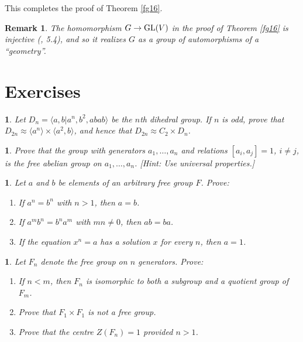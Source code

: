 \documentclass[a4paper,11pt,final,openany]{memoir}%
\newtheorem{remark}[X]{Remark}
\newtheorem{exercise}[Y]{}
\theoremstyle{nonumberplain}
\begin{document}
This completes the proof of Theorem \ref{fg16}.

\begin{remark}
\label{fg19}The homomorphism $G\rightarrow\operatorname{GL}(V)$ in the proof of Theorem
\ref{fg16} is injective (\cite{humphreys1990}, 5.4), and so it realizes $G$ as
a group of automorphisms of a \textquotedblleft geometry\textquotedblright.
\end{remark}

\section{Exercises}

\begin{exercise}
\label{x13} Let $D_{n}=\langle a,b|a^{n},b^{2},abab\rangle$ be the $n$th
dihedral group. If $n$ is odd, prove that $D_{2n}\approx\langle a^{n}%
\rangle\times\langle a^{2},b\rangle$, and hence that $D_{2n}\approx
C_{2}\times D_{n}$.
\end{exercise}

\begin{exercise}
\label{x5} Prove that the group with generators $a_{1},\ldots,a_{n}$ and
relations $[a_{i},a_{j}]=1$, $i\neq j$, is the free \textit{abelian\/} group
on $a_{1},\ldots,a_{n}$. [Hint: Use universal properties.]
\end{exercise}

\begin{exercise}
\label{x6} Let $a$ and $b$ be elements of an arbitrary free group $F$. Prove:

\begin{enumerate}
\item If $a^{n}=b^{n}$ with $n>1$, then $a=b$.

\item If $a^{m}b^{n}=b^{n}a^{m}$ with $mn\not =0$, then $ab=ba$.

\item If the equation $x^{n}=a$ has a solution $x$ for every $n$, then $a=1$.
\end{enumerate}
\end{exercise}

\begin{exercise}
\label{x7} Let $F_{n}$ denote the free group on $n$ generators. Prove:

\begin{enumerate}
\item If $n<m$, then $F_{n}$ is isomorphic to both a subgroup and a quotient
group of $F_{m}$.

\item Prove that $F_{1}\times F_{1}$ is not a free group.

\item Prove that the centre $Z(F_{n})=1$ provided $n>1$.
\end{enumerate}
\end{exercise}
\end{document}
